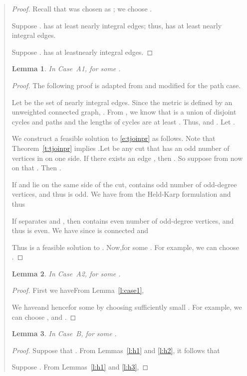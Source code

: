 \documentclass[11pt,letterpaper]{article}
\newtheorem{lemma}{Lemma}
\begin{document}
\begin{quote}
\begin{proof}
Recall that  was chosen as ; we choose .

Suppose .  has at least  nearly integral edges; thus,  has at least  nearly integral edges.

Suppose .  has at leastnearly integral edges.
\end{proof}

\begin{lemma}
\label{l:fca1}
In Case~A1,  for some .
\end{lemma}
\begin{proof}
The following proof is adapted from \cite{OSS} and modified for the path case.

Let  be the set of nearly integral edges. Since the metric is defined by an unweighted connected graph, . From , we know that  is a union of disjoint cycles and paths and the lengths of cycles are at least . Thus,  and . Let .

We construct a feasible solution  to \eqref{e:tjoinpr} as follows. Note that Theorem~\ref{t:tjoinpr} implies .Let  be any cut that has an odd number of vertices in  on one side. If there exists an edge , then . So suppose from now on that . Then .

If  and  lie on the same side of the cut,  contains odd number of odd-degree vertices, and thus  is odd. We have  from the Held-Karp formulation and thus

If  separates  and , then  contains even number of odd-degree vertices, and thus  is even. We have  since  is connected and

Thus  is a feasible solution to . Now,for some . For example, we can choose .
\end{proof}

\begin{lemma}
\label{l:fca2}
In Case~A2,  for some .
\end{lemma}
\begin{proof}
First we haveFrom Lemma~\ref{l:case1},

We haveand hencefor some  by choosing sufficiently small . For example, we can choose ,  and .
\end{proof}

\begin{lemma}
\label{l:fcb}
In Case~B,  for some .
\end{lemma}
\begin{proof}
Suppose that . From Lemmas~\ref{l:h1} and \ref{l:h2}, it follows that

Suppose . From Lemmas~\ref{l:h1} and \ref{l:h3},


\end{proof}
\end{quote}
\end{document}
